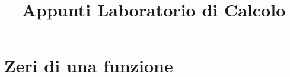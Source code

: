 \documentclass[11pt]{article}
\title{Appunti Laboratorio di Calcolo}
\begin{document}
\section{Zeri di una funzione}
\end{document}
